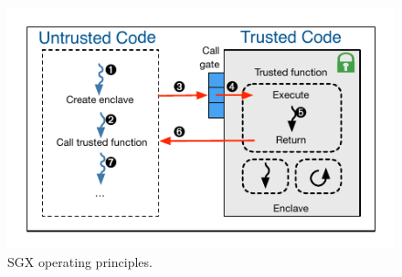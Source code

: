 \begin{figure}[!t]
  \centering
  \includegraphics[scale=0.8]{images/sgx.pdf}
  \caption{SGX operating principles.}
  \label{fig:sgx}
\end{figure}

